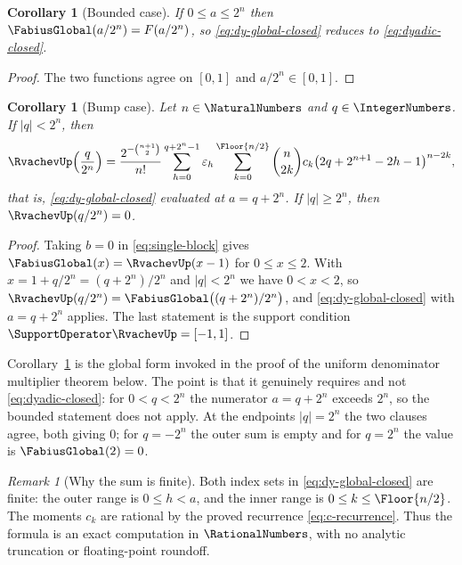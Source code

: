 \documentclass[11pt,oneside]{article}
\newtheorem{corollary}[theorem]{Corollary}
\theoremstyle{definition}
\theoremstyle{remark}
\newtheorem{remark}[theorem]{Remark}
\begin{document}
\begin{corollary}[Bounded case]
\label{cor:dy-bounded-case}
If $0\le a\le2^n$ then $\FabiusGlobal(a/2^n)=F(a/2^n)$, so \eqref{eq:dy-global-closed}
reduces to \eqref{eq:dyadic-closed}.
\end{corollary}

\begin{proof}
The two functions agree on $[0,1]$ and $a/2^n\in[0,1]$.
\end{proof}

\begin{corollary}[Bump case]
\label{cor:dy-bump-case}
Let $n\in\NaturalNumbers$ and $q\in\IntegerNumbers$.  If $|q|<2^n$, then
\begin{equation}
 \RvachevUp\!\left(\frac q{2^n}\right)
 =\frac{2^{-\binom{n+1}{2}}}{n!}
 \sum_{h=0}^{q+2^n-1}\varepsilon_h
 \sum_{k=0}^{\Floor{n/2}}
 \binom n{2k}c_k\bigl(2q+2^{n+1}-2h-1\bigr)^{n-2k},
                                                               \label{eq:dy-bump-case}
\end{equation}
that is, \eqref{eq:dy-global-closed} evaluated at $a=q+2^n$.  If $|q|\ge2^n$, then
$\RvachevUp(q/2^n)=0$.
\end{corollary}

\begin{proof}
Taking $b=0$ in \eqref{eq:single-block} gives $\FabiusGlobal(x)=\RvachevUp(x-1)$ for $0\le x\le2$.
With $x=1+q/2^n=(q+2^n)/2^n$ and $|q|<2^n$ we have $0<x<2$, so
$\RvachevUp(q/2^n)=\FabiusGlobal\bigl((q+2^n)/2^n\bigr)$, and
\eqref{eq:dy-global-closed} with $a=q+2^n$ applies.  The last statement is the support
condition $\SupportOperator\RvachevUp=[-1,1]$.
\end{proof}

Corollary~\ref{cor:dy-bump-case} is the global form invoked in the proof of the uniform
denominator multiplier theorem below.  The point is that it genuinely requires
 and not \eqref{eq:dyadic-closed}: for $0<q<2^n$ the numerator
$a=q+2^n$ exceeds $2^n$, so the bounded statement does not apply.  At the endpoints
$|q|=2^n$ the two clauses agree, both giving $0$; for $q=-2^n$ the outer sum is empty and
for $q=2^n$ the value is $\FabiusGlobal(2)=0$.

\begin{remark}[Why the sum is finite]
\label{rem:dy-finiteness}
Both index sets in \eqref{eq:dy-global-closed} are finite: the outer range is
\(0\le h<a\), and the inner range is \(0\le k\le\Floor{n/2}\).
The moments \(c_k\) are rational by the proved recurrence \eqref{eq:c-recurrence}.
Thus the formula is an exact computation in \(\RationalNumbers\), with no analytic truncation or
floating-point roundoff.
\end{remark}
\end{document}

